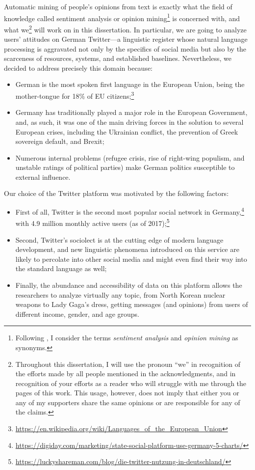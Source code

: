 Automatic mining of people's opinions from text is exactly what the
field of knowledge called sentiment analysis or opinion
mining\footnote{Following \citet{Liu:12}, I consider the terms
  \emph{sentiment analysis} and \emph{opinion mining} as synonyms.} is
concerned with, and what we\footnote{Throughout this dissertation, I
  will use the pronoun ``we'' in recognition of the efforts made by
  all people mentioned in the acknowledgments, and in recognition of
  your efforts as a reader who will struggle with me through the pages
  of this work.  This usage, however, does not imply that either you
  or any of my supporters share the same opinions or are responsible
  for any of the claims.} will work on in this dissertation.  In
particular, we are going to analyze users' attitudes on German
Twitter---a linguistic register whose natural language processing is
aggravated not only by the specifics of social media but also by the
scarceness of resources, systems, and established baselines.
Nevertheless, we decided to address precisely this domain because:
\begin{itemize}
  \item German is the most spoken first language in the European
    Union, being the mother-tongue for 18\% of EU
    citizens;\footnote{\url{https://en.wikipedia.org/wiki/Languages_of_the_European_Union}}
  \item Germany has traditionally played a major role in the European
    Government, and, as such, it was one of the main driving forces in
    the solution to several European crises, including the Ukrainian
    conflict, the prevention of Greek sovereign default, and Brexit;
  \item Numerous internal problems (refugee crisis, rise of right-wing
    populism, and unstable ratings of political parties) make German
    politics susceptible to external influence.
\end{itemize}

Our choice of the Twitter platform was motivated by the following
factors:
\begin{itemize}
  \item First of all, Twitter is the second most popular social
    network in
    Germany,\footnote{\url{https://digiday.com/marketing/state-social-platform-use-germany-5-charts/}}
    with 4.9 million monthly active users (as of
    2017);\footnote{\url{https://luckyshareman.com/blog/die-twitter-nutzung-in-deutschland/}}
  \item Second, Twitter's sociolect is at the cutting edge of modern
    language development, and new linguistic phenomena introduced on
    this service are likely to percolate into other social media and
    might even find their way into the standard language as well;
  \item Finally, the abundance and accessibility of data on this
    platform allows the researchers to analyze virtually any topic,
    from North Korean nuclear weapons to Lady Gaga's dress, getting
    messages (and opinions) from users of different income, gender,
    and age groups.
\end{itemize}

